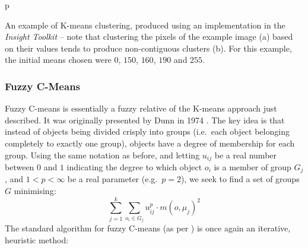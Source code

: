 \begin{stusubfig}{p}
	\hspace{4mm}%
\caption{An example of K-means clustering, produced using an implementation in the \emph{Insight Toolkit} -- note that clustering the pixels of the example image (a) based on their values tends to produce non-contiguous clusters (b). For this example, the initial means chosen were $0$, $150$, $160$, $190$ and $255$.}
\label{fig:background-segmentation-kmeans}
\end{stusubfig}

\subsubsection{Fuzzy C-Means}

Fuzzy C-means is essentially a fuzzy relative of the K-means approach just described. It was originally presented by Dunn in 1974 \cite{dunn74}. The key idea is that instead of objects being divided crisply into groups (i.e.~each object belonging completely to exactly one group), objects have a degree of membership for each group. Using the same notation as before, and letting $u_{ij}$ be a real number between $0$ and $1$ indicating the degree to which object $o_i$ is a member of group $G_j$, and $1 < p < \infty$ be a real parameter (e.g.~$p = 2$), we seek to find a set of groups $G$ minimising:
%
\[
\sum_{j=1}^k \sum_{o_i \in G_j} u_{ij}^p \cdot m(o,\mu_j)^2
\]
%
The standard algorithm for fuzzy C-means (as per \cite{matteucci}) is once again an iterative, heuristic method:

